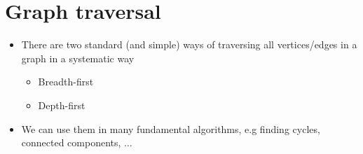 \section{Graph traversal}
\begin{itemize}
	\item There are two standard (and simple) ways of traversing all
	vertices/edges in a graph in a systematic way
	\begin{itemize}
		\item Breadth-first
		\item Depth-first
	\end{itemize}
	\item We can use them in many fundamental algorithms, e.g finding cycles,
	connected components, $\dots$
\end{itemize}


